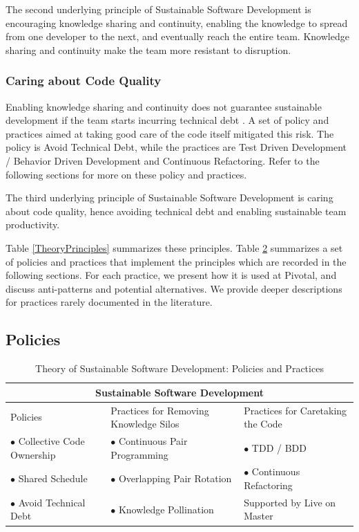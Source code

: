 \begin{table}[]
The second underlying principle of Sustainable Software Development is encouraging knowledge sharing and continuity, enabling the knowledge to spread from one developer to the next, and eventually reach the entire team. Knowledge sharing and continuity make the team more resistant to disruption. 

\subsubsection{Caring about Code Quality}

Enabling knowledge sharing and continuity does not guarantee sustainable development if the team starts incurring technical debt  \cite{McConnellTechnicalDebt}. A set of policy and practices aimed at taking good care of the code itself mitigated this risk. The policy is Avoid Technical Debt, while the practices are Test Driven Development / Behavior Driven Development and Continuous Refactoring. Refer to the following sections for more on these policy and practices.

The third underlying principle of Sustainable Software Development is caring about code quality, hence avoiding technical debt and enabling sustainable team productivity.

Table \ref{TheoryPrinciples} summarizes these principles. Table \ref{TheoryPractices}  summarizes a set of policies and practices that implement the principles which are recorded in the following sections. For each practice, we present how it is used at Pivotal, and discuss anti-patterns and potential alternatives. We provide deeper descriptions for practices rarely documented in the literature.
\subsection{Policies}

\begin{table}[]
\renewcommand{\arraystretch}{1.5}
\centering
\caption{Theory of Sustainable Software Development: Policies and Practices}
\label{TheoryPractices}
\begin{tabular}{l|l|l}
\hline
\multicolumn{3}{c}{Sustainable Software Development}                               \\
\hline
Policies                  & Practices for Removing Knowledge Silos & Practices for Caretaking the Code         \\
$\bullet$ Collective Code Ownership & $\bullet$ Continuous Pair Programming         & $\bullet$  TDD / BDD                   \\
$\bullet$ Shared Schedule           & $\bullet$ Overlapping Pair Rotation & $\bullet$ Continuous Refactoring      \\
$\bullet$ Avoid Technical Debt      & $\bullet$  Knowledge Pollination    & Supported by Live on Master \\ 
\hline
\end{tabular}
\end{table}


\end{table}
